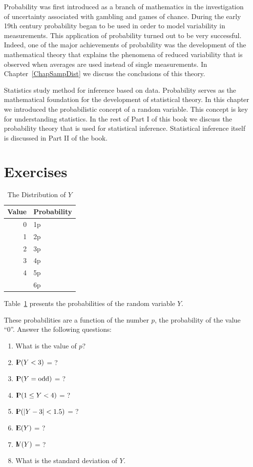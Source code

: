 \documentclass[]{krantz}
\newcommand{\Expec}{{\rm I\kern-.3em E}}
\newcommand{\Prob}{{\rm I\kern-.3em P}}
\newcommand{\Var}{{\rm I\kern-.3em V}}
\theoremstyle{definition}
\theoremstyle{definition}
\theoremstyle{definition}
\theoremstyle{remark}
\let\BeginKnitrBlock\begin \let\EndKnitrBlock\end
\begin{document}
Probability was first introduced as a branch of mathematics in the
investigation of uncertainty associated with gambling and games of
chance. During the early 19th century probability began to be used in
order to model variability in measurements. This application of
probability turned out to be very successful. Indeed, one of the major
achievements of probability was the development of the mathematical
theory that explains the phenomena of reduced variability that is
observed when averages are used instead of single measurements. In
Chapter~\ref{ChapSampDist} we discuss the conclusions of this theory.

Statistics study method for inference based on data. Probability serves
as the mathematical foundation for the development of statistical
theory. In this chapter we introduced the probabilistic concept of a
random variable. This concept is key for understanding statistics. In
the rest of Part I of this book we discuss the probability theory that
is used for statistical inference. Statistical inference itself is
discussed in Part II of the book.

\hypertarget{exercises-3}{%
\section{Exercises}\label{exercises-3}}

\begin{table}[t]

\caption{\label{tab:tab4}The Distribution of $Y$}
\centering
\begin{tabular}{rl}
\toprule
Value & Probability\\
\midrule
0 & 1p\\
1 & 2p\\
2 & 3p\\
3 & 4p\\
4 & 5p\\
\addlinespace
5 & 6p\\
\bottomrule
\end{tabular}
\end{table}

\BeginKnitrBlock{exercise}
\protect\hypertarget{exr:unnamed-chunk-50}{}{\label{exr:unnamed-chunk-50} }Table~\ref{tab:tab4} presents the
probabilities of the random variable \(Y\).

These probabilities are a
function of the number \(p\), the probability of the value ``0''. Answer the
following questions:

\begin{enumerate}
\def\labelenumi{\arabic{enumi}.}
\item
  What is the value of \(p\)?
\item
  \(\Prob(Y <3 )\) = ?
\item
  \(\Prob(Y = \mbox{odd})\) = ?
\item
  \(\Prob(1 \leq Y < 4)\) = ?
\item
  \(\Prob(|Y -3| < 1.5)\) = ?
\item
  \(\Expec(Y)\) = ?
\item
  \(\Var(Y)\) = ?
\item
  What is the standard deviation of \(Y\).
\end{enumerate}
\EndKnitrBlock{exercise}
\end{document}
